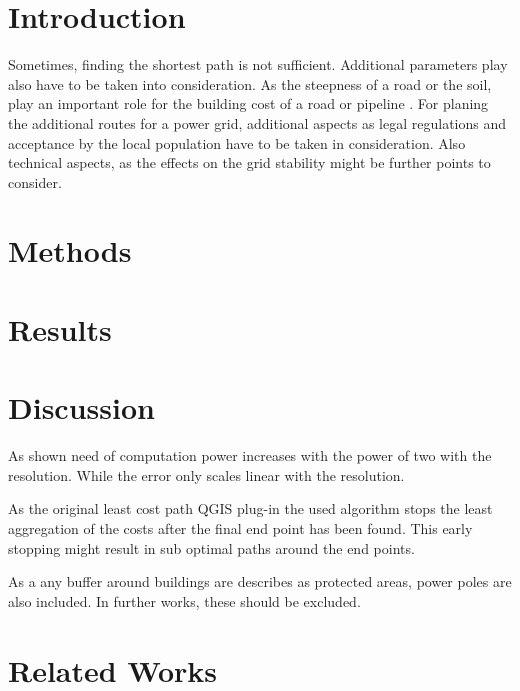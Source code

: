 \documentclass[acmtog]{acmart}
\begin{document}
	\section{Introduction}\label{sec:introduction}

	Sometimes, finding the shortest path is not sufficient.
	Additional parameters play also have to be taken into consideration.
	As the steepness of a road or the soil, play an important role for the building cost of a road or pipeline
	.
	For planing the additional routes for a power grid, additional aspects as legal regulations and acceptance
	by the local population have to be taken in consideration.
	Also technical aspects, as the effects on the grid stability might be further points to consider.\cite{schafer_understanding_2022}


	\section{Methods}\label{sec:methods}
	

	\section{Results}\label{sec:results}
	

	\section{Discussion}\label{sec:discussion}
	As shown need of computation power increases with the power of two with the resolution.
	While the error only scales linear with the resolution.
	
	As the original least cost path QGIS plug-in the used algorithm stops the least aggregation of the costs after the final end point has been found.
	This early stopping might result in sub optimal paths around the end points.
	
	As a any buffer around buildings are describes as protected areas, power poles are also included.
	In further works, these should be excluded.
	
	\section{Related Works}\label{sec:related-works}
\end{document}
